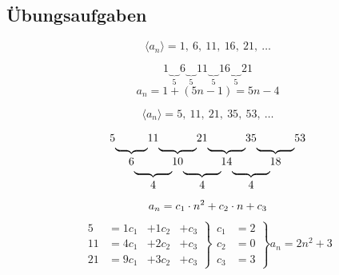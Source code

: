 \subsection{Übungsaufgaben}

\begin{uebung}[1]
    \begin{aufgabe}
        \[
            \langle a_n \rangle = 1,\ 6,\ 11,\ 16,\ 21,\ \ldots
        \]
    \end{aufgabe}

    \begin{loesung}
        \[
            1\underbrace{\quad}_{5}6\underbrace{\quad}_{5}11\underbrace{\quad}_{5}16\underbrace{\quad}_{5}21 
        \]
        \[
            a_n = 1+(5n - 1) = 5n - 4
        \]
    \end{loesung}    
\end{uebung}

\begin{uebung}[2]
    \begin{aufgabe}
        \[
            \langle a_n \rangle = 5,\ 11,\ 21,\ 35,\ 53,\ \ldots
        \]
    \end{aufgabe}

    \begin{loesung}
        \[
            \begin{tabular}{ccccccccccccc}
                5&&11&&21&&35&&53\\[-3pt]
                & \ubf&&\ubf&&\ubf&&\ubf \\
                & 6&&10&&14&&18\\[-3pt]
                &  &\ubf&&\ubf&&\ubf \\
                &  &4&&4&&4
            \end{tabular}
        \]
        \[
            a_n = c_1 \cdot n^2 + c_2 \cdot n + c_3 \\
        \]
        \begin{align*}
            \left.
            \begin{array}{ccccc}
                5 &= 1 c_1  &+ 1 c_2 &+ c_3 \\
                11 &= 4 c_1 &+ 2 c_2 &+ c_3 \\
                21 &= 9 c_1 &+ 3 c_2 &+ c_3
            \end{array}
            \right \}
            \left.
            \begin{array}{cc}
                c_1 &= 2 \\
                c_2 &= 0 \\
                c_3 &= 3
            \end{array}
            \right \}
            a_n = 2n^2 + 3
        \end{align*}
    \end{loesung}    
\end{uebung}


